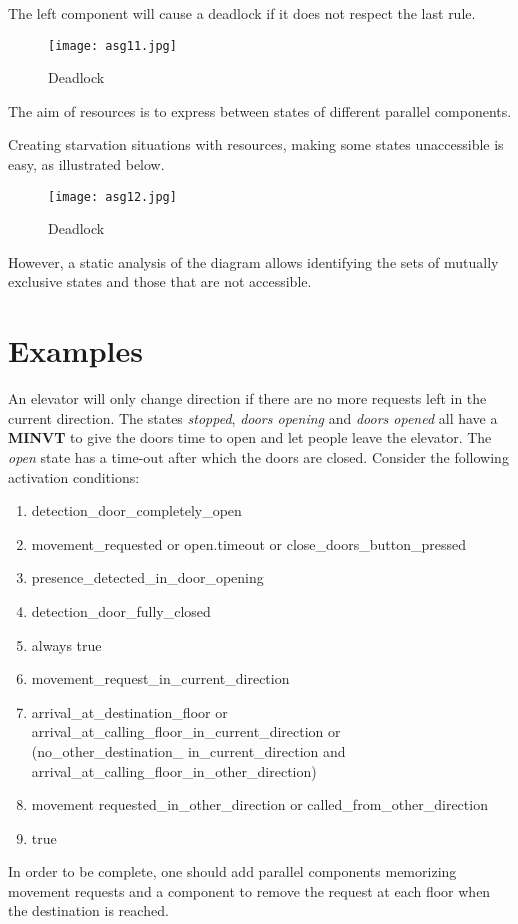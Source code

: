 \documentclass[../main.tex]{subfiles}
\begin{document}
\begin{exmp}
The left component will cause a deadlock if it does not respect the last rule.
\begin{figure}[H]
    \centering
    \texttt{[image: asg11.jpg]}
    \caption{Deadlock}
    \label{asg11}
\end{figure}
\end{exmp}
The aim of resources is to express  between states of different parallel components.
\begin{exmp}
Creating starvation situations with resources, making some states unaccessible is easy, as illustrated below.
\begin{figure}[H]
    \centering
    \texttt{[image: asg12.jpg]}
    \caption{Deadlock}
    \label{asg12}
\end{figure}
However, a static analysis of the diagram allows identifying the sets of mutually exclusive states and those that are not accessible.
\end{exmp}

\section{Examples}
\begin{exmp}
An elevator will only change direction if there are no more requests left in the current direction. The states \textit{stopped}, \textit{doors opening} and \textit{doors opened} all have a \textbf{MINVT} to give the doors time to open and let people leave the elevator. The \textit{open} state has a time-out after which the doors are closed. Consider the following activation conditions:
\begin{enumerate}
	\item detection\_door\_completely\_open
	\item movement\_requested or open.timeout or close\_doors\_button\_pressed
	\item presence\_detected\_in\_door\_opening
	\item detection\_door\_fully\_closed
	\item always true
	\item movement\_request\_in\_current\_direction
	\item arrival\_at\_destination\_floor or arrival\_at\_calling\_floor\_in\_current\_direction or \\ (no\_other\_destination\_ in\_current\_direction and arrival\_at\_calling\_floor\_in\_other\_direction)
	\item movement requested\_in\_other\_direction or called\_from\_other\_direction
	\item true
\end{enumerate}
In order to be complete, one should add parallel components memorizing movement requests and a component to remove the request at each floor when the destination is reached.
\end{exmp}
\end{document}
